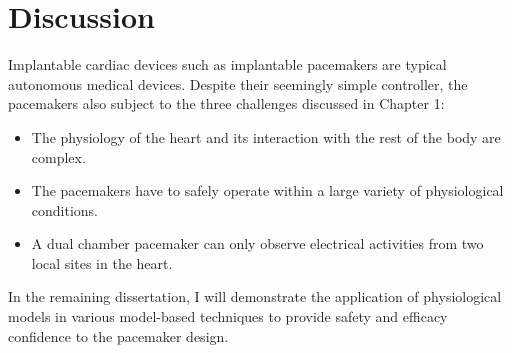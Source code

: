 \section{Discussion}
Implantable cardiac devices such as implantable pacemakers are typical autonomous medical devices.
Despite their seemingly simple controller, the pacemakers also subject to the three challenges discussed in Chapter 1:
\begin{itemize}
	\item The physiology of the heart and its interaction with the rest of the body are complex.
\item The pacemakers have to safely operate within a large variety of physiological conditions.
\item A dual chamber pacemaker can only observe electrical activities from two local sites in the heart.
\end{itemize}
In the remaining dissertation, I will demonstrate the application of physiological models in various model-based techniques to provide safety and efficacy confidence to the pacemaker design.


